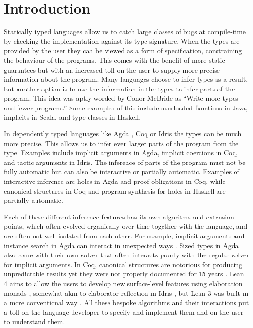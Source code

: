 \hypertarget{sec:introduction}{%
\section{Introduction}\label{sec:introduction}}

Statically typed languages allow us to catch large classes of bugs at
compile-time by checking the implementation against its type signature.
When the types are provided by the user they can be viewed as a form of
specification, constraining the behaviour of the programs. This comes
with the benefit of more static guarantees but with an increased toll on
the user to supply more precise information about the program. Many
languages choose to infer types as a result, but another option is to
use the information in the types to infer parts of the program. This
idea was aptly worded by Conor McBride as ``Write more types and fewer
programs.''
\citetext{\citealp{ptoopTypeInferenceThought2022}; \citealp[chap.~2.1]{mcbrideEpigramPracticalProgramming2005}}
Some examples of this include overloaded functions in Java, implicits in
Scala, and type classes in Haskell.

In dependently typed languages like Agda
\citep{norellPracticalProgrammingLanguage2007, theagdateamAgdaUserManual2023a},
Coq \citep{thecoqdevelopmentteamCoqProofAssistant2022} or Idris
\citep{bradyIdrisGeneralpurposeDependently2013} the types can be much
more precise. This allows us to infer even larger parts of the program
from the type. Examples include implicit arguments in Agda, implicit
coercions in Coq, and tactic arguments in Idris. The inference of parts
of the program must not be fully automatic but can also be interactive
or partially automatic. Examples of interactive inference are holes in
Agda and proof obligations in Coq, while canonical structures
\citep{mahboubiCanonicalStructuresWorking2013} in Coq and
program-synthesis for holes in Haskell
\citep{koppelSearchingEntangledProgram2022} are partially automatic.

Each of these different inference features has its own algoritms and
extension points, which often evolved organically over time together
with the language, and are often not well isolated from each other. For
example, implicit arguments and instance search in Agda can interact in
unexpected ways \citep{agdausersPerformanceRegressionIssue2018}. Sized
types in Agda \citep{abelExtensionMartinLofType2016} also come with
their own solver that often interacts poorly with the regular solver for
implicit arguments. In Coq, canonical structures are notorious for
producing unpredictable results yet they were not properly documented
for 15 years \citep{mahboubiCanonicalStructuresWorking2013}. Lean 4 aims
to allow the users to develop new surface-level features
\citep{leonardodemouraLeanMetaprogramming2021} using elaboration monads
\citep{mouraLeanTheoremProver2021}, somewhat akin to elaborator
reflection in Idris
\citep{christiansenElaboratorReflectionExtending2016}, but Lean 3 was
built in a more conventional way \citep{demouraLeanTheoremProver2015}.
All these bespoke algorithms and their interactions put a toll on the
language developer to specify and implement them and on the user to
understand them.

